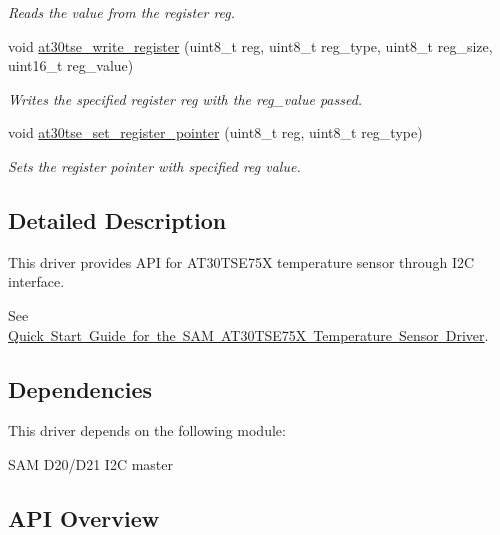 \begin{DoxyCompactItemize}
\begin{DoxyCompactList}\small\item\em Reads the value from the register reg. \end{DoxyCompactList}\item 
void \mbox{\hyperlink{group__asfdoc__sam0__at30tse75x__group_ga6fd33519be27348bc7feacc8b04f0cb5}{at30tse\+\_\+write\+\_\+register}} (uint8\+\_\+t reg, uint8\+\_\+t reg\+\_\+type, uint8\+\_\+t reg\+\_\+size, uint16\+\_\+t reg\+\_\+value)
\begin{DoxyCompactList}\small\item\em Writes the specified register reg with the reg\+\_\+value passed. \end{DoxyCompactList}\item 
void \mbox{\hyperlink{group__asfdoc__sam0__at30tse75x__group_ga5c34d0f1aab15ec6899f2e01f8abaf7b}{at30tse\+\_\+set\+\_\+register\+\_\+pointer}} (uint8\+\_\+t reg, uint8\+\_\+t reg\+\_\+type)
\begin{DoxyCompactList}\small\item\em Sets the register pointer with specified reg value. \end{DoxyCompactList}\end{DoxyCompactItemize}


\subsection{Detailed Description}
This driver provides A\+PI for A\+T30\+T\+S\+E75X temperature sensor through I2C interface.

See \mbox{\hyperlink{asfdoc_sam0_at30tse75x_qs}{Quick Start Guide for the S\+AM A\+T30\+T\+S\+E75X Temperature Sensor Driver}}.\hypertarget{group__asfdoc__sam0__at30tse75x__group_asfdoc_sam0_at30tse75x_dependencies}{}\subsection{Dependencies}\label{group__asfdoc__sam0__at30tse75x__group_asfdoc_sam0_at30tse75x_dependencies}
This driver depends on the following module\+:
\begin{DoxyItemize}
\item S\+AM D20/\+D21 I2C master
\end{DoxyItemize}\hypertarget{group__asfdoc__sam0__at30tse75x__group_asfdoc_sam0_at30tse75x_api_overview}{}\subsection{A\+P\+I Overview}\label{group__asfdoc__sam0__at30tse75x__group_asfdoc_sam0_at30tse75x_api_overview}


